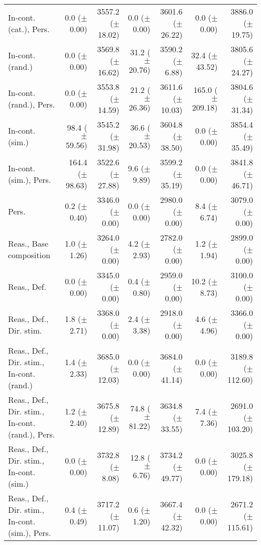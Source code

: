 \begin{table*}
\begin{tabular}{lrrrrrr}
        In-cont. (cat.), Pers. & 0.0 ($\pm$ 0.00) & 3557.2 ($\pm$ 18.02) & 0.0 ($\pm$ 0.00) & 3601.6 ($\pm$ 26.22) & 0.0 ($\pm$ 0.00) & 3886.0 ($\pm$ 19.75) \\
        In-cont. (rand.) & 0.0 ($\pm$ 0.00) & 3569.8 ($\pm$ 16.62) & 31.2 ($\pm$ 20.76) & 3590.2 ($\pm$ 6.88) & 32.4 ($\pm$ 43.52) & 3805.6 ($\pm$ 24.27) \\
        In-cont. (rand.), Pers. & 0.0 ($\pm$ 0.00) & 3553.8 ($\pm$ 14.59) & 21.2 ($\pm$ 26.36) & 3611.6 ($\pm$ 10.03) & 165.0 ($\pm$ 209.18) & 3804.6 ($\pm$ 31.34) \\
        In-cont. (sim.) & 98.4 ($\pm$ 59.56) & 3545.2 ($\pm$ 31.98) & 36.6 ($\pm$ 20.53) & 3604.8 ($\pm$ 38.50) & 0.0 ($\pm$ 0.00) & 3854.4 ($\pm$ 35.49) \\
        In-cont. (sim.), Pers. & 164.4 ($\pm$ 98.63) & 3522.6 ($\pm$ 27.88) & 9.6 ($\pm$ 9.89) & 3599.2 ($\pm$ 35.19) & 0.0 ($\pm$ 0.00) & 3841.8 ($\pm$ 46.71) \\
        Pers. & 0.2 ($\pm$ 0.40) & 3346.0 ($\pm$ 0.00) & 0.0 ($\pm$ 0.00) & 2980.0 ($\pm$ 0.00) & 8.4 ($\pm$ 6.74) & 3079.0 ($\pm$ 0.00) \\
        Reas., Base composition & 1.0 ($\pm$ 1.26) & 3264.0 ($\pm$ 0.00) & 4.2 ($\pm$ 2.93) & 2782.0 ($\pm$ 0.00) & 1.2 ($\pm$ 1.94) & 2899.0 ($\pm$ 0.00) \\
        Reas., Def. & 0.0 ($\pm$ 0.00) & 3345.0 ($\pm$ 0.00) & 0.4 ($\pm$ 0.80) & 2959.0 ($\pm$ 0.00) & 10.2 ($\pm$ 8.73) & 3100.0 ($\pm$ 0.00) \\
        Reas., Def., Dir. stim. & 1.8 ($\pm$ 2.71) & 3368.0 ($\pm$ 0.00) & 2.4 ($\pm$ 3.38) & 2918.0 ($\pm$ 0.00) & 4.6 ($\pm$ 4.96) & 3366.0 ($\pm$ 0.00) \\
        Reas., Def., Dir. stim., In-cont. (rand.) & 1.4 ($\pm$ 2.33) & 3685.0 ($\pm$ 12.03) & 0.0 ($\pm$ 0.00) & 3684.0 ($\pm$ 41.14) & 0.0 ($\pm$ 0.00) & 3189.8 ($\pm$ 112.60) \\
        Reas., Def., Dir. stim., In-cont. (rand.), Pers. & 1.2 ($\pm$ 2.40) & 3675.8 ($\pm$ 12.89) & 74.8 ($\pm$ 81.22) & 3634.8 ($\pm$ 33.55) & 7.4 ($\pm$ 7.36) & 2691.0 ($\pm$ 103.20) \\
        Reas., Def., Dir. stim., In-cont. (sim.) & 0.0 ($\pm$ 0.00) & 3732.8 ($\pm$ 8.08) & 12.8 ($\pm$ 6.76) & 3734.2 ($\pm$ 49.77) & 0.0 ($\pm$ 0.00) & 3025.8 ($\pm$ 179.18) \\
        Reas., Def., Dir. stim., In-cont. (sim.), Pers. & 0.4 ($\pm$ 0.49) & 3717.2 ($\pm$ 11.07) & 0.6 ($\pm$ 1.20) & 3667.4 ($\pm$ 42.32) & 0.0 ($\pm$ 0.00) & 2671.2 ($\pm$ 115.61) \\

\end{tabular}
\end{table*}
